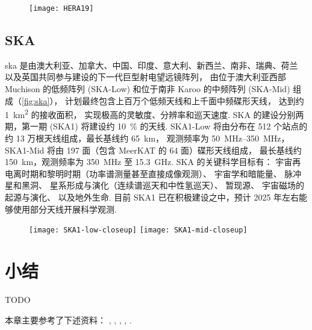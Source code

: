 \begin{figure}[htp]
  \centering
  \texttt{[image: HERA19]}
  \label{fig:hera}
\end{figure}

\subsection{SKA}

\acf{ska} 是由澳大利亚、加拿大、中国、印度、意大利、新西兰、南非、瑞典、荷兰
以及英国共同参与建设的下一代巨型射电望远镜阵列，
由位于澳大利亚西部 Muchison 的低频阵列 (SKA-Low)
和位于南非 Karoo 的中频阵列 (SKA-Mid) 组成（\autoref{fig:ska}），
计划最终包含上百万个低频天线和上千面中频碟形天线，
达到约 \SI{1}{\km\squared} 的接收面积，
实现极高的灵敏度、分辨率和巡天速度.
SKA 的建设分别两期，第一期 (SKA1) 将建设约 \SI{10}{\percent} 的天线.
SKA1-Low 将由分布在 512 个站点的约 13 万根天线组成，最长基线约 \SI{65}{\km}，
观测频率为 \SIrange{50}{350}{\MHz}，
SKA1-Mid 将由 197 面（包含 MeerKAT 的 64 面）碟形天线组成，
最长基线约 \SI{150}{\km}，观测频率为 \SI{350}{\MHz} 至 \SI{15.3}{\GHz}.
SKA 的关键科学目标有\cite{braun2015}：
宇宙再电离时期和黎明时期（功率谱测量甚至直接成像观测）\cite{mellema2013,mellema2015,koopmans2015}、
宇宙学和暗能量\cite{maartens2015,santos2015}、
脉冲星和黑洞\cite{kramer2015}、
星系形成与演化（连续谱巡天和中性氢巡天）\cite{prandoni2015,staveley2015}、
暂现源\cite{fender2015}、
宇宙磁场的起源与演化\cite{johnston2015}、
以及地外生命\cite{hoare2015}.
目前 SKA1 已在积极建设之中，预计 2025 年左右能够使用部分天线开展科学观测.

\begin{figure}[htp]
  \centering
  \texttt{[image: SKA1-low-closeup]}%
  \texttt{[image: SKA1-mid-closeup]}
  \label{fig:ska}
\end{figure}


\section{小结}

TODO

本章主要参考了下述资料：
, , ,
, .

